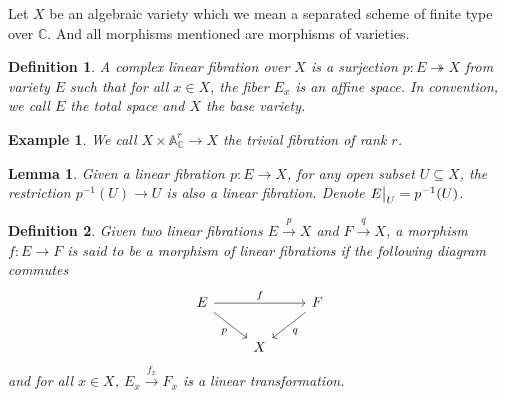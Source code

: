 \documentclass{ctexart}
\newtheorem{definition}{Definition}[section]
\newtheorem{lemma}{Lemma}[section]
\newtheorem{example}{Example}[section]
\begin{document}
Let $X$ be an algebraic variety which we mean a separated scheme of finite type over $\mathbb{C}$.
And all morphisms mentioned are morphisms of varieties.
\begin{definition}
    A complex linear fibration over $X$ is a surjection $p: E \twoheadrightarrow X$ from variety $E$ such that for all $x\in X$, 
    the fiber $E_{x}$ is an affine space.
    In convention, we call $E$ the total space and $X$ the base variety.
\end{definition}
\begin{example}
    We call $X \times \mathbb{A}_{\mathbb{C}}^{r} \rightarrow X$ the trivial fibration of rank $r$.
\end{example}
\begin{lemma}
    Given a linear fibration $p: E \rightarrow X$, for any open subset $U \subseteq X$,
    the restriction $p^{-1}(U) \rightarrow U$ is also a linear fibration.
    Denote $E\big{|}_{U} = p^{-1}(U)$.
    \label{Lemma 1.2}
\end{lemma}
\begin{definition}
    Given two linear fibrations $E \overset{p}{\rightarrow} X$ and $F \overset{q}{\rightarrow} X$,
    a morphism $f: E \rightarrow F$ is said to be a morphism of linear fibrations if the following diagram commutes
    \begin{equation}
        \begin{tikzcd}
            E \arrow[rr, "f"] \arrow[dr, "p" swap] &&
            F \arrow[dl, "q"] \\
            & X &
        \end{tikzcd}
    \end{equation}
    and for all $x\in X$, $E_{x} \overset{f_{x}}{\rightarrow} F_{x}$ is a linear transformation.
\end{definition}
\end{document}
